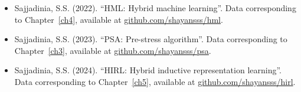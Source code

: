 \documentclass[12pt,a4paper]{report}
\begin{document}
\begin{itemize}
\begin{itemize}
    \item Sajjadinia, S.S. (2022). “HML: Hybrid machine learning”. Data corresponding to Chapter~\ref{ch4}, available at \href{https://github.com/shayansss/hml}{github.com/shayansss/hml}.
    \item Sajjadinia, S.S. (2023). “PSA: Pre-stress algorithm”. Data corresponding to Chapter~\ref{ch3}, available at \href{https://github.com/shayansss/psa}{github.com/shayansss/psa}.
    \item Sajjadinia, S.S. (2024). “HIRL: Hybrid inductive representation learning”. Data corresponding to Chapter~\ref{ch5}, available at \href{https://github.com/shayansss/hirl}{github.com/shayansss/hirl}.
\end{itemize}
\end{itemize}

\clearpage

\tableofcontents
\newpage
\end{document}

